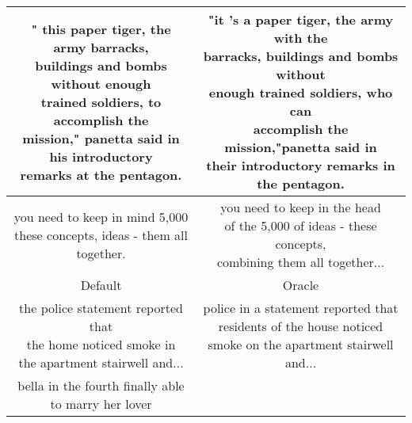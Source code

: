 \begin{table}
\begin{tabular}{||c|c||}
	\hline
	\parbox{7cm}{\vspace{.5\baselineskip} " this paper tiger, the army barracks,\\buildings and bombs without enough\\trained soldiers, to accomplish the\\mission," panetta said in his introductory\\remarks at the pentagon.\vspace{.5\baselineskip}}&
	\parbox{7cm}{\vspace{.5\baselineskip} "it 's a paper tiger, the army with the\\barracks, buildings and bombs without\\enough trained soldiers, who can\\accomplish the mission,"panetta said in\\ their introductory remarks in the pentagon.\vspace{.5\baselineskip}}\\
	\hline
	\parbox{7cm}{\vspace{.5\baselineskip} you need to keep in mind 5,000\\these concepts, ideas - them all together.\vspace{.5\baselineskip}}&
	\parbox{7cm}{\vspace{.5\baselineskip} you need to keep in the head\\of the 5,000 of ideas - these concepts,\\combining them all together...\vspace{.5\baselineskip}}\\
	\hline
	Default & Oracle\\
	\hline
	\parbox{7cm}{\vspace{.5\baselineskip} the police statement reported that\\the home noticed smoke in\\the apartment stairwell and... \vspace{.5\baselineskip}} &
	\parbox{7cm}{\vspace{.5\baselineskip} police in a statement reported that\\residents of the house noticed\\smoke on the apartment stairwell and... \vspace{.5\baselineskip}}\\
	\hline
	\parbox{7cm}{\vspace{.5\baselineskip} bella in the fourth finally able\\to marry her lover\vspace{.5\baselineskip}}&

\end{tabular}
\end{table}
